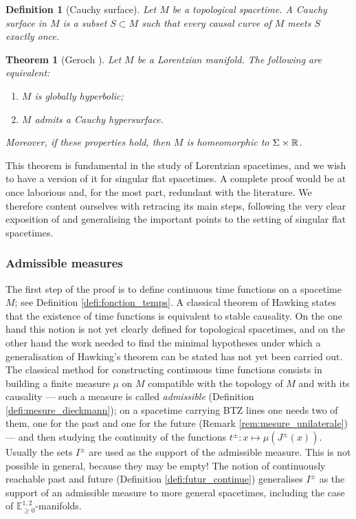 \documentclass[a4paper,twoside]{article}
\newcommand{\mass}[1]{\mathbb{E}^{1,2}_{#1}}
\newtheorem{defi}[lem]{Definition}
\newtheorem{theo}{Theorem}
\begin{document}
\begin{defi}[Cauchy surface]\label{def:cauchy_surface} Let $M$ be a topological spacetime. A Cauchy surface in $M$ is a subset
$S\subset M$ such that every causal curve of $M$ meets $S$ exactly once.
\end{defi}
\begin{theo}[Geroch \cite{MR0270697}]\label{theo:geroch_mr} Let $M$ be a Lorentzian manifold. The following are equivalent:
\begin{enumerate}[label=(\roman*)]
\item $M$ is globally hyperbolic;
\item $M$ admits a Cauchy hypersurface.
\end{enumerate}
Moreover, if these properties hold, then $M$ is homeomorphic to $\Sigma\times \mathbb R$.
\end{theo}
This theorem is fundamental in the study of Lorentzian spacetimes,
and we wish to have a version of it for singular flat spacetimes. A complete proof would be at once laborious and, for the most part,
redundant with the literature.
We therefore content ourselves with retracing its main steps, following the very clear exposition of \cite{MR2196783} and generalising the important points to the setting of singular flat spacetimes.

\subsubsection{Admissible measures}
The first step of the proof is to define continuous time functions on a spacetime
$M$; see Definition \ref{defi:fonction_temps}.
A classical theorem of Hawking states that the existence of time functions is equivalent to stable causality.
On the one hand this notion is not yet clearly defined for topological spacetimes, and on the other hand the work needed
to find the minimal hypotheses under which a generalisation of Hawking's theorem can be stated has not yet been carried out.
The classical method \cite{MR0270697,MR0334862,MR962333,MR2196783} for constructing continuous time functions
consists in building a finite measure $\mu$ on $M$ compatible with the
topology of $M$ and with its causality --- such a measure is called {\it admissible} (Definition \ref{defi:mesure_dieckmann}); on a spacetime carrying BTZ lines one needs two of them, one for the past and one for the future (Remark \ref{rem:mesure_unilaterale}) ---
and then studying the continuity of the functions $t^\pm : x\mapsto \mu(J^\pm(x))$.
Usually the sets $I^\pm$ are used as the support of the admissible measure. This is not possible in general, because they may be empty!
The notion of continuously reachable past and future (Definition \ref{defi:futur_continue}) generalises $I^\pm$ as the support of an admissible measure
to more general spacetimes, including the case of $\mass{\geq0}$-manifolds.
\end{document}
